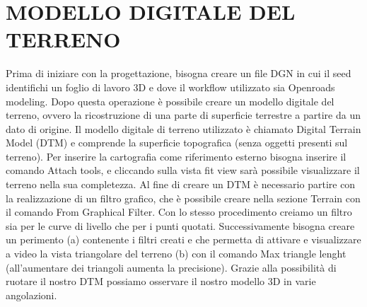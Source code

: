 \chapter{MODELLO DIGITALE DEL TERRENO}
Prima di iniziare con la progettazione, bisogna creare un file DGN in cui il seed identifichi un foglio di lavoro 3D e dove il workflow utilizzato sia Openroads modeling. Dopo questa operazione è possibile creare un modello digitale del terreno, ovvero la ricostruzione di una parte di superficie terrestre a partire da un dato di origine.  Il modello digitale di terreno utilizzato è chiamato Digital Terrain Model (DTM) e comprende la superficie topografica (senza oggetti presenti sul terreno). Per inserire la cartografia come riferimento esterno bisogna inserire il comando Attach tools, e cliccando sulla vista fit view sarà possibile visualizzare il terreno nella sua completezza. Al fine di creare un DTM è necessario partire con la realizzazione di un filtro grafico, che è possibile creare nella sezione Terrain con il comando From Graphical Filter. Con lo stesso procedimento creiamo un filtro sia per le curve di livello che per i punti quotati. Successivamente bisogna creare un perimento (a) contenente i filtri creati e che permetta di attivare e visualizzare a video la vista triangolare del terreno (b) con il comando Max triangle lenght (all’aumentare dei triangoli aumenta la precisione). Grazie alla possibilità di ruotare il nostro DTM possiamo osservare il nostro modello 3D in varie angolazioni.

